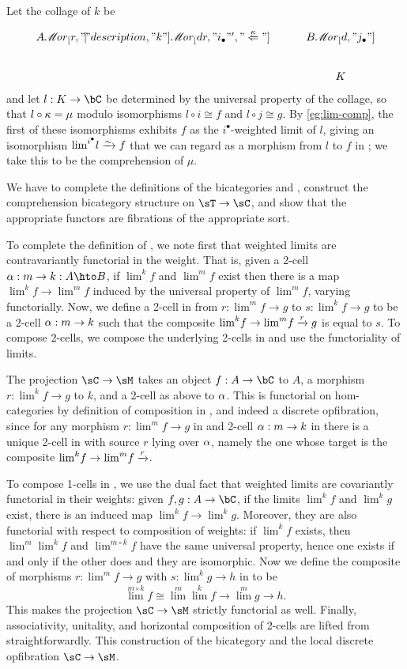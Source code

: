 \documentclass{amsart}
\def\ar#1{\mathscr{M}\!\mathit{or}_{#1}}
\def\rep#1{{#1}_\bullet}
\def\corep#1{{#1}^\bullet}
\let\mylim\lim
\def\lim{{\textstyle\mylim}}
\begin{document}
\begin{prob}
\begin{itemize}
    Let the collage of $k$ be
    \[
    \begin{tikzcd}
      A \ar[r,"\mathclap{|}" description,"k"] \ar[dr,"\rep i"',"\overset\kappa\Leftarrow"] & B \ar[d,"\rep j"] \\ & K
    \end{tikzcd}
    \]
    and let $l:K\to \bC$ be determined by the universal property of the collage, so that $l \circ \kappa = \mu$ modulo isomorphisms $l\circ i\cong f$ and $l\circ j \cong g$.
    By \cref{eg:lim-comp}, the first of these isomorphisms exhibits $f$ as the $\corep i$-weighted limit of $l$, giving an isomorphism $\lim^{\corep i} l \toiso f$ that we can regard as a morphism from $l$ to $f$ in \sC; we take this to be the comprehension of $\mu$.
  \end{itemize}
\end{prob}
\begin{constr}
  We have to complete the definitions of the bicategories \sC and \sT, construct the comprehension bicategory structure on $\sT\to\sC$, and show that the appropriate functors are fibrations of the appropriate sort.

  To complete the definition of \sC, we note first that weighted limits are contravariantly functorial in the weight.
  That is, given a 2-cell $\al:m\to k:A\hto B$, if $\lim^k f$ and $\lim^m f$ exist then there is a map $\lim^k f\to\lim^m f$ induced by the universal property of $\lim^m f$, varying functorially.
  Now, we define a 2-cell in \sC from $r:\lim^m f \to g$ to $s:\lim^k f \to g$ to be a 2-cell $\alpha:m\to k$ such that the composite $\lim^k f\to\lim^m f \xto{r} g$ is equal to $s$.
  To compose 2-cells, we compose the underlying 2-cells in \sM and use the functoriality of limits.

  The projection $\sC\to\sM$ takes an object $f:A\to \bC$ to $A$, a morphism $r:\lim^k f \to g$ to $k$, and a 2-cell as above to $\alpha$.
  This is functorial on hom-categories by definition of composition in \sC, and indeed a discrete opfibration, since for any morphism $r:\lim^m f \to g$ in \sC and 2-cell $\alpha:m\to k$ in \sM there is a unique 2-cell in \sC with source $r$ lying over $\alpha$, namely the one whose target is the composite $\lim^k f\to\lim^m f \xto{r}$.

  To compose 1-cells in \sC, we use the dual fact that weighted limits are covariantly functorial in their weights: given $f,g:A\to \bC$, if the limits $\lim^k f$ and $\lim^k g$ exist, there is an induced map $\lim^k f\to\lim^k g$.
  Moreover, they are also functorial with respect to composition of weights: if $\lim^k f$ exists, then $\lim^m \lim^k f$ and $\lim^{m\circ k} f$ have the same universal property, hence one exists if and only if the other does and they are isomorphic.
  Now we define the composite of morphisms $r:\lim^m f \to g$ with $s:\lim^k g\to h$ in \sC to be
  \[ \lim^{m\circ k} f \cong \lim^m \lim^k f \to \lim^m g \to h. \]
  This makes the projection $\sC\to\sM$ strictly functorial as well.
  Finally, associativity, unitality, and horizontal composition of 2-cells are lifted from \sM straightforwardly.
  This construction of the bicategory \sC and the local discrete opfibration $\sC\to\sM$.


\end{constr}
\end{document}
